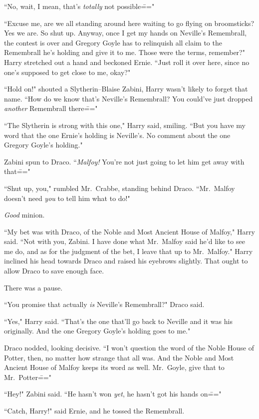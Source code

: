 ``No, wait, I mean, that's \emph{totally} not possible\==="

``Excuse me, are we all standing around here waiting to go flying on broomsticks? Yes we are. So shut up. Anyway, once I get my hands on Neville's Remembrall, the contest is over and Gregory Goyle has to relinquish all claim to the Remembrall he's holding and give it to me. Those were the terms, remember?" Harry stretched out a hand and beckoned Ernie. ``Just roll it over here, since no one's supposed to get close to me, okay?"

``Hold on!" shouted a Slytherin\---Blaise Zabini, Harry wasn't likely to forget that name. ``How do we know that's Neville's Remembrall? You could've just dropped \emph{another} Remembrall there\==="

``The Slytherin is strong with this one," Harry said, smiling. ``But you have my word that the one Ernie's holding is Neville's. No comment about the one Gregory Goyle's holding."

Zabini spun to Draco. ``\emph{Malfoy!} You're not just going to let him get away with that\==="

``Shut up, you," rumbled Mr.~Crabbe, standing behind Draco. ``Mr.~Malfoy doesn't need \emph{you} to tell him what to do!"

\emph{Good} minion.

``My bet was with Draco, of the Noble and Most Ancient House of Malfoy," Harry said. ``Not with you, Zabini. I have done what Mr.~Malfoy said he'd like to see me do, and as for the judgment of the bet, I leave that up to Mr.~Malfoy." Harry inclined his head towards Draco and raised his eyebrows slightly. That ought to allow Draco to save enough face.

There was a pause.

``You promise that actually \emph{is} Neville's Remembrall?" Draco said.

``Yes," Harry said. ``That's the one that'll go back to Neville and it was his originally. And the one Gregory Goyle's holding goes to me."

Draco nodded, looking decisive. ``I won't question the word of the Noble House of Potter, then, no matter how strange that all was. And the Noble and Most Ancient House of Malfoy keeps its word as well. Mr.~Goyle, give that to Mr.~Potter\==="

``Hey!" Zabini said. ``He hasn't won \emph{yet}, he hasn't got his hands on\==="

``Catch, Harry!" said Ernie, and he tossed the Remembrall.

